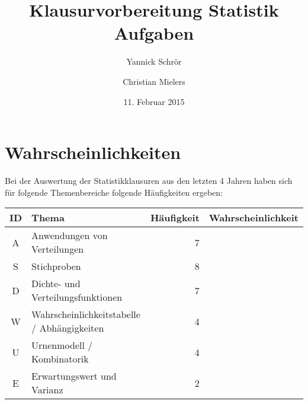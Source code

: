 \documentclass[11pt, a4paper]{article}
\title{Klausurvorbereitung Statistik \\ Aufgaben}
\author{Yannick Schrör \and Christian Mielers}
\date{11. Februar 2015}
\begin{document}
\maketitle
\section{Wahrscheinlichkeiten}
Bei der Auswertung der Statistikklausuren aus den letzten 4 Jahren haben sich für folgende Themenbereiche folgende Häufigkeiten ergeben:\\

\begin{tabular}{c|l|r|r}
	ID 	&	Thema 										& Häufigkeit 	& Wahrscheinlichkeit\\ \hline
	A	& Anwendungen von Verteilungen 					& 7 			& \\
	S	& Stichproben 									& 8				& \\
	D	& Dichte- und Verteilungsfunktionen 			& 7 			& \\
	W	& Wahrscheinlichkeitstabelle / Abhängigkeiten 	& 4 			& \\
	U	& Urnenmodell / Kombinatorik 					& 4 			& \\
	E	& Erwartungswert und Varianz 					& 2 			& \\
\end{tabular}\\
\end{document}
